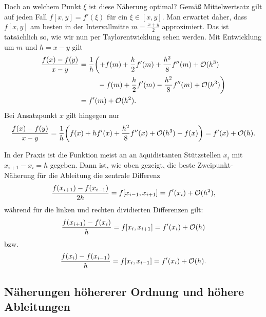 Doch an welchem Punkt $\xi$ ist diese Näherung optimal? Gemäß
Mittelwertsatz gilt auf jeden Fall $f[x,y]=f'(\xi)$ für ein $\xi\in
[x,y]$. Man erwartet daher, dass $f[x,y]$ am besten in der
Intervallmitte $m=\frac{x+y}{2}$ approximiert. Das ist tatsächlich so,
wie wir nun per Taylorentwicklung sehen werden. Mit Entwicklung um $m$
und $h=x-y$ gilt
\begin{align}
  \frac{f(x) - f(y)}{x-y} &= \frac{1}{h}
  \biggl(+f(m) + \frac{h}{2}f'(m) + \frac{h^2}{8}f''(m) + \O(h^3)\nonumber\\
  &\phantom{= \frac{1}{h}\biggl(}-f(m) + \frac{h}{2}f'(m) - \frac{h^2}{8}f''(m) + \O(h^3)
  \biggr)\nonumber\\
  &=  f'(m) + \O(h^2).
\end{align}
Bei Ansatzpunkt $x$ gilt hingegen nur
\begin{align}
  \frac{f(x) - f(y)}{x-y} = \frac{1}{h}
  \biggl(f(x) + h f'(x) + \frac{h^2}{8}f''(x) + \mathcal O(h^3) - f(x) \biggr)
  =  f'(x) + \mathcal O(h).
\end{align}

In der Praxis ist die Funktion meist an an äquidistanten Stützstellen
$x_i$ mit $x_{i+1}-x_i=h$ gegeben. Dann ist, wie oben gezeigt, die
beste Zweipunkt-Näherung für die Ableitung die zentrale Differenz
\begin{equation}
  \label{eq:2orderdiff}
  \frac{f(x_{i+1}) - f(x_{i-1})}{2h} = f[x_{i-1},x_{i+1}] = f'(x_i) + \mathcal O(h^2),
\end{equation}
während für die linken und rechten dividierten Differenzen gilt:
\begin{equation}
  \frac{f(x_{i+1}) - f(x_{i})}{h} = f[x_{i},x_{i+1}] = f'(x_i) + \mathcal O(h)
\end{equation}
bzw.
\begin{equation}
  \frac{f(x_{i}) - f(x_{i-1})}{h} = f[x_{i},x_{i-1}] = f'(x_i) + \mathcal O(h).
\end{equation}

\subsection{Näherungen höhererer Ordnung und höhere Ableitungen}

